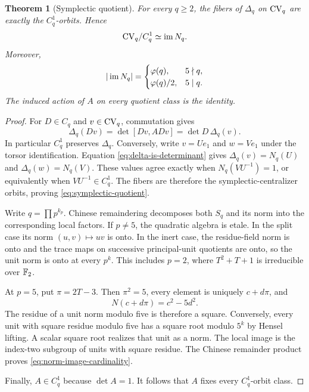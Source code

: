 \documentclass[11pt]{article}
\newtheorem{theorem}{Theorem}[section]
\theoremstyle{definition}
\theoremstyle{remark}
\begin{document}
\begin{theorem}[Symplectic quotient]
\label{thm:symplectic-quotient}
For every \(q\ge2\), the fibers of \(\Delta_q\) on \(\mathrm{CV}_q\) are exactly
the \(C_q^1\)-orbits.  Hence
\begin{equation}
  \mathrm{CV}_q/C_q^1\simeq\operatorname{im} N_q.
  \label{eq:symplectic-quotient}
\end{equation}
Moreover,
\begin{equation}
  |\operatorname{im} N_q|=
  \begin{cases}
    \varphi(q),&5\nmid q,\\
    \varphi(q)/2,&5\mid q.
  \end{cases}
  \label{eq:norm-image-cardinality}
\end{equation}
The induced action of \(A\) on every quotient class is the identity.
\end{theorem}

\begin{proof}
For \(D\in C_q\) and \(v\in\mathrm{CV}_q\), commutation gives
\begin{equation}
  \Delta_q(Dv)
  =\det[Dv,ADv]
  =\det D\,\Delta_q(v).
  \label{eq:delta-covariance}
\end{equation}
In particular \(C_q^1\) preserves \(\Delta_q\).  Conversely, write
\(v=Ue_1\) and \(w=Ve_1\) under the torsor identification.  Equation
\eqref{eq:delta-is-determinant} gives
\(\Delta_q(v)=N_q(U)\) and \(\Delta_q(w)=N_q(V)\).  These values agree
exactly when \(N_q(VU^{-1})=1\), or equivalently when
\(VU^{-1}\in C_q^1\).  The fibers are therefore the symplectic-centralizer
orbits, proving \eqref{eq:symplectic-quotient}.

Write \(q=\prod p^{k_p}\).  Chinese remaindering decomposes both \(S_q\)
and its norm into the corresponding local factors.  If \(p\ne5\), the
quadratic algebra is etale.  In the split case its norm
\((u,v)\mapsto uv\) is onto.  In the inert case, the residue-field norm is
onto and the trace maps on successive principal-unit quotients are onto, so
the unit norm is onto at every \(p^k\).  This includes \(p=2\), where
\(T^2+T+1\) is irreducible over \(\mathbb{F}_2\).

At \(p=5\), put \(\pi=2T-3\).  Then \(\pi^2=5\), every element is uniquely
\(c+d\pi\), and
\begin{equation}
  N(c+d\pi)=c^2-5d^2.
  \label{eq:ramified-norm}
\end{equation}
The residue of a unit norm modulo five is therefore a square.  Conversely,
every unit with square residue modulo five has a square root modulo \(5^k\)
by Hensel lifting.  A scalar square root realizes that unit as a norm.  The
local image is the index-two subgroup of units with square residue.  The
Chinese remainder product proves \eqref{eq:norm-image-cardinality}.

Finally, \(A\in C_q^1\) because \(\det A=1\).  It follows that \(A\) fixes
every \(C_q^1\)-orbit class.
\end{proof}
\end{document}

